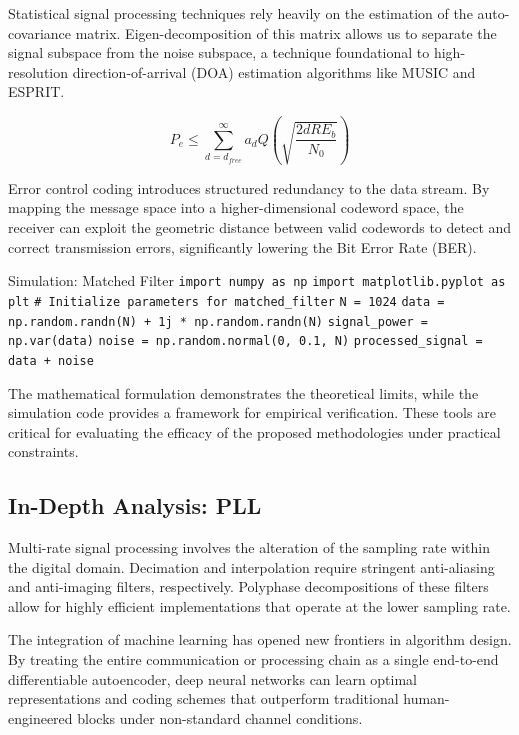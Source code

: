 Statistical signal processing techniques rely heavily on the estimation of the auto-covariance matrix. Eigen-decomposition of this matrix allows us to separate the signal subspace from the noise subspace, a technique foundational to high-resolution direction-of-arrival (DOA) estimation algorithms like MUSIC and ESPRIT.

\begin{equation}
    P_e \leq \sum_{d=d_{free}}^{\infty} a_d Q\left(\sqrt{\frac{2 d R E_b}{N_0}}\right)
\end{equation}

Error control coding introduces structured redundancy to the data stream. By mapping the message space into a higher-dimensional codeword space, the receiver can exploit the geometric distance between valid codewords to detect and correct transmission errors, significantly lowering the Bit Error Rate (BER).

\begin{pythonbox}{Simulation: Matched Filter}
\texttt{import numpy as np}
\texttt{import matplotlib.pyplot as plt}
\texttt{}
\texttt{\# Initialize parameters for matched\_filter}
\texttt{N = 1024}
\texttt{data = np.random.randn(N) + 1j * np.random.randn(N)}
\texttt{signal\_power = np.var(data)}
\texttt{noise = np.random.normal(0, 0.1, N)}
\texttt{processed\_signal = data + noise}
\end{pythonbox}

\vspace{0.5cm}
The mathematical formulation demonstrates the theoretical limits, while the simulation code provides a framework for empirical verification. These tools are critical for evaluating the efficacy of the proposed methodologies under practical constraints.


\subsection{In-Depth Analysis: PLL}
Multi-rate signal processing involves the alteration of the sampling rate within the digital domain. Decimation and interpolation require stringent anti-aliasing and anti-imaging filters, respectively. Polyphase decompositions of these filters allow for highly efficient implementations that operate at the lower sampling rate.

The integration of machine learning has opened new frontiers in algorithm design. By treating the entire communication or processing chain as a single end-to-end differentiable autoencoder, deep neural networks can learn optimal representations and coding schemes that outperform traditional human-engineered blocks under non-standard channel conditions.

